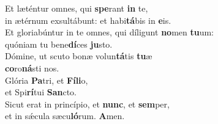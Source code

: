\oddverse Et læténtur omnes, qui \textbf{spe}rant \textbf{in} te,~\*\\
\oddverse in ætérnum exsultábunt: et habi\textbf{tá}bis in \textbf{e}is.\\
\evenverse Et gloriabúntur in te omnes, qui díligunt \textbf{no}men \textbf{tu}um:~\*\\
\evenverse quóniam tu bene\textbf{dí}ces \textbf{ju}sto.\\
\oddverse Dómine, ut scuto bonæ volun\textbf{tá}tis \textbf{tu}æ~\*\\
\oddverse \textbf{co}ro\textbf{ná}sti nos.\\
\evenverse Glória \textbf{Pa}tri, et \textbf{Fí}\textbf{li}o,~\*\\
\evenverse et Spi\textbf{rí}tui \textbf{San}cto.\\
\oddverse Sicut erat in princípio, et \textbf{nunc}, et \textbf{sem}per,~\*\\
\oddverse et in sǽcula sæcu\textbf{ló}rum. \textbf{A}men.\\
